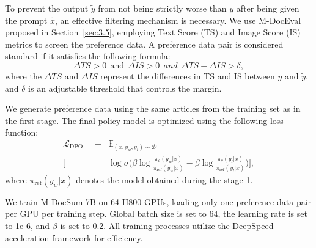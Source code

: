 To prevent the output $\widetilde{y}$ from not being strictly worse than $y$ after being given the prompt $\widetilde{x}$, an effective filtering mechanism is necessary. 
We use M-DocEval proposed in Section~\ref{sec:3.5}, employing Text Score (TS) and Image Score (IS) metrics to screen the preference data.
A preference data pair is considered standard if it satisfies the following formula:
\begin{equation}
    \Delta TS > 0~~\text{and}~~\Delta IS > 0~~and~~\Delta TS + \Delta IS > \delta,
\end{equation}
where the $\Delta TS$ and $\Delta IS$ represent the differences in TS and IS between $y$ and $\widetilde{y}$, and $\delta$ is an adjustable threshold that controls the margin.


We generate preference data using the same articles from the training set as in the first stage. 
The final policy model is optimized using the following loss function:
\begin{equation}
\begin{aligned}
    \mathcal{L}_{\text{DPO}} = -&\mathbb{E}_{(x, y_w, y_l) \sim \mathcal{D}} \\ \Big[ &\log \sigma \Big( \beta \log \frac{\pi_\theta(y_w|x)}{\pi_{\text{ref}}(y_w|x)} - \beta \log \frac{\pi_\theta(y_l|x)}{\pi_{\text{ref}}(y_l|x)} \Big) \Big],
\end{aligned}
\end{equation}
where $\pi_{\text{ref}}(y_w|x)$ denotes the model obtained during the stage 1.

We train M-DocSum-7B on 64 H800 GPUs, loading only one preference data pair per GPU per training step. 
Global batch size is set to 64, the learning rate is set to 1e-6, and $\beta$ is set to 0.2. 
All training processes utilize the DeepSpeed acceleration framework for efficiency.
